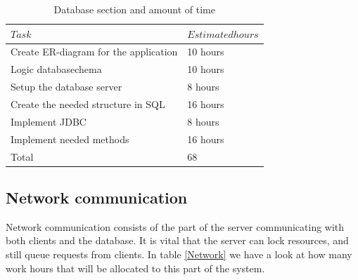 \documentclass[a4paper, english, 12pt]{article}
\begin{document}
\begin{table}[h!]
    \begin{center}
    \caption{Database section and amount of time} 
    \label{database}
    \vspace{0,5cm}
    \begin{tabular}{ll} \\ 
        \hline
        $Task$ & $Estimated hours$\\
        \hline 
    Create ER-diagram for the application & 10 hours\\
    Logic databasechema & 10 hours\\    
    Setup the database server & 8 hours\\
    Create the needed structure in SQL & 16 hours\\
    Implement JDBC & 8 hours\\
    Implement needed methods & 16 hours\\
    \hline 
    Total & 68
    \hline
    \end{tabular}
    \end{center}
\end{table}

\subsection{Network communication}
Network communication consists of the part of the server communicating with both clients and the database. It is vital that the server can lock resources, and still queue requests from clients. In table \ref{Network} we have a look at how many work hours that will be allocated to this part of the system.
\end{document}
